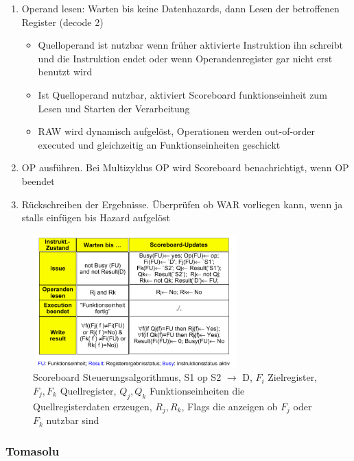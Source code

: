 \begin{itemize}
\begin{enumerate}
			\item
				Operand lesen: Warten bis keine Datenhazards, dann Lesen der betroffenen Register (decode 2)
				\begin{itemize}
					\item
						Quelloperand ist nutzbar wenn früher aktivierte Instruktion ihn schreibt und die Instruktion endet oder wenn Operandenregister gar nicht erst benutzt wird
					\item
						Ist Quelloperand nutzbar, aktiviert Scoreboard funktionseinheit zum Lesen und Starten der Verarbeitung
					\item
						RAW wird dynamisch aufgelöst, Operationen werden out-of-order executed und gleichzeitig an Funktionseinheiten geschickt
				\end{itemize}
			\item
				OP ausführen. Bei Multizyklus OP wird Scoreboard benachrichtigt, wenn OP beendet
			\item
				Rückschreiben der Ergebnisse. Überprüfen ob WAR vorliegen kann, wenn ja stalls einfügen bis Hazard aufgelöst

		\end{enumerate}
						\begin{figure}[hpbt]
							\centering
							\includegraphics[width=0.7\textwidth]{img/scoreboard.png}
							\caption{Scoreboard Steuerungsalgorithmus, S1 op S2 $\rightarrow$ D, $F_i$ Zielregister, $F_j,F_k$ Quellregister, $Q_j,Q_k$ Funktionseinheiten die Quellregisterdaten erzeugen, $R_j,R_k$, Flags die anzeigen ob $F_j$ oder $F_k$ nutzbar sind}
							\label{fig:scoreboard}
						\end{figure}
\end{itemize}
\subsubsection{Tomasolu}
\label{tomasolu}

